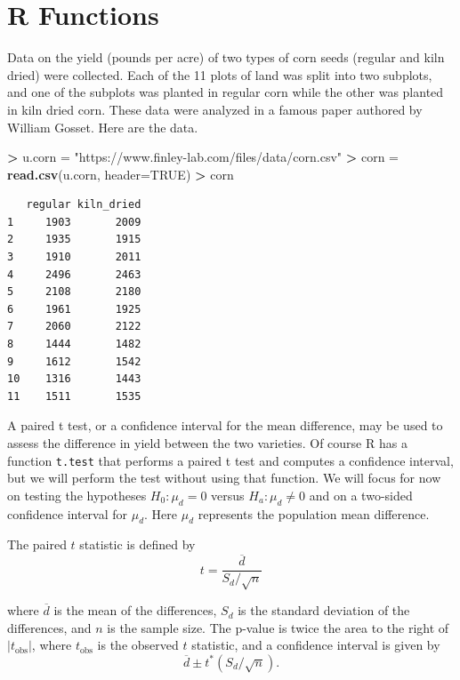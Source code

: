 \documentclass[
]{krantz}
\makeatletter
\newenvironment{Shaded}{\begin{snugshade}}{\end{snugshade}}
\newcommand{\DataTypeTok}[1]{\textcolor[rgb]{0.27,0.27,0.27}{#1}}
\newcommand{\KeywordTok}[1]{\textcolor[rgb]{0.27,0.27,0.27}{\textbf{#1}}}
\newcommand{\NormalTok}[1]{#1}
\newcommand{\OperatorTok}[1]{\textcolor[rgb]{0.43,0.43,0.43}{\textbf{#1}}}
\newcommand{\OtherTok}[1]{\textcolor[rgb]{0.37,0.37,0.37}{#1}}
\newcommand{\StringTok}[1]{\textcolor[rgb]{0.5,0.5,0.5}{#1}}
\newenvironment{kframe}{%
\medskip{}
\setlength{\fboxsep}{.8em}
 \def\at@end@of@kframe{}%
 \ifinner\ifhmode%
  \def\at@end@of@kframe{\end{minipage}}%
  \begin{minipage}{\columnwidth}%
 \fi\fi%
 \def\FrameCommand##1{\hskip\@totalleftmargin \hskip-\fboxsep
 \colorbox{shadecolor}{##1}\hskip-\fboxsep
     \hskip-\linewidth \hskip-\@totalleftmargin \hskip\columnwidth}%
 \MakeFramed {\advance\hsize-\width
   \@totalleftmargin\z@ \linewidth\hsize
   \@setminipage}}%
 {\par\unskip\endMakeFramed%
 \at@end@of@kframe}
\renewenvironment{Shaded}{\begin{kframe}}{\end{kframe}}
\makeatother
\begin{document}
\hypertarget{r-functions}{%
\section{R Functions}\label{r-functions}}

Data on the yield (pounds per acre) of two types of corn seeds (regular and kiln dried) were collected. Each of the 11 plots of land was split into two subplots, and one of the subplots was planted in regular corn while the other was planted in kiln dried corn. These data were analyzed in a famous paper authored by William Gosset. Here are the data.

\begin{Shaded}
\begin{Highlighting}[]
\OperatorTok{\textgreater{}}\StringTok{ }\NormalTok{u.corn =}\StringTok{ "https://www.finley{-}lab.com/files/data/corn.csv"}
\OperatorTok{\textgreater{}}\StringTok{ }\NormalTok{corn =}\StringTok{ }\KeywordTok{read.csv}\NormalTok{(u.corn, }\DataTypeTok{header=}\OtherTok{TRUE}\NormalTok{)}
\OperatorTok{\textgreater{}}\StringTok{ }\NormalTok{corn}
\end{Highlighting}
\end{Shaded}

\begin{verbatim}
   regular kiln_dried
1     1903       2009
2     1935       1915
3     1910       2011
4     2496       2463
5     2108       2180
6     1961       1925
7     2060       2122
8     1444       1482
9     1612       1542
10    1316       1443
11    1511       1535
\end{verbatim}

A paired t test, or a confidence interval for the mean difference, may be used to assess the difference in yield between the two varieties. Of course R has a function \texttt{t.test} that performs a paired t test and computes a confidence interval, but we will perform the test without using that function. We will focus for now on testing the hypotheses \(H_0\colon \mu_d = 0\) versus \(H_a\colon \mu_d \neq 0\) and on a two-sided confidence interval for \(\mu_d\). Here \(\mu_d\) represents the population mean difference.

The paired \(t\) statistic is defined by
\begin{equation}
t = \frac{\overline d}{S_d/\sqrt{n}}
\end{equation}

where \(\overline d\) is the mean of the differences, \(S_d\) is the standard deviation of the differences, and \(n\) is the sample size. The p-value is twice the area to the right of \(|t_{\text{obs}}|\), where \(t_{\text{obs}}\) is the observed \(t\) statistic, and a confidence interval is given by
\begin{equation}
\overline d \pm t^* (S_d/\sqrt{n}).
\end{equation}
\end{document}
